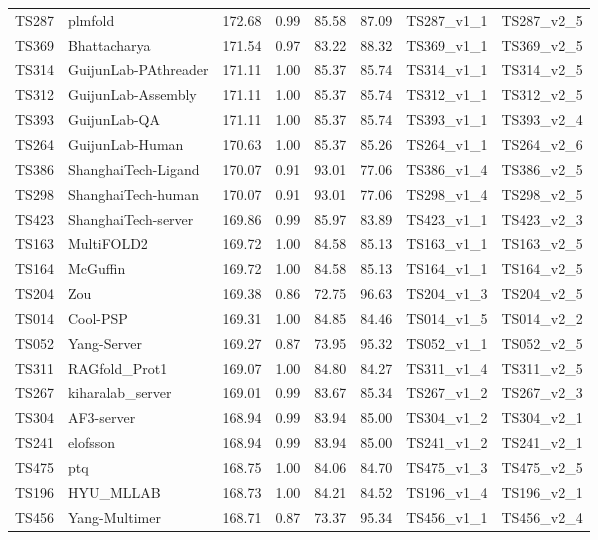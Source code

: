 \begin{table}[ht]
{\begin{tabular}{llllllll}
TS287 & plmfold & 172.68 & 0.99 & 85.58 & 87.09 & TS287\_v1\_1 & TS287\_v2\_5 \\ 
TS369 & Bhattacharya & 171.54 & 0.97 & 83.22 & 88.32 & TS369\_v1\_1 & TS369\_v2\_5 \\ 
TS314 & GuijunLab-PAthreader & 171.11 & 1.00 & 85.37 & 85.74 & TS314\_v1\_1 & TS314\_v2\_5 \\ 
TS312 & GuijunLab-Assembly & 171.11 & 1.00 & 85.37 & 85.74 & TS312\_v1\_1 & TS312\_v2\_5 \\ 
TS393 & GuijunLab-QA & 171.11 & 1.00 & 85.37 & 85.74 & TS393\_v1\_1 & TS393\_v2\_4 \\ 
TS264 & GuijunLab-Human & 170.63 & 1.00 & 85.37 & 85.26 & TS264\_v1\_1 & TS264\_v2\_6 \\ 
TS386 & ShanghaiTech-Ligand & 170.07 & 0.91 & 93.01 & 77.06 & TS386\_v1\_4 & TS386\_v2\_5 \\ 
TS298 & ShanghaiTech-human & 170.07 & 0.91 & 93.01 & 77.06 & TS298\_v1\_4 & TS298\_v2\_5 \\ 
TS423 & ShanghaiTech-server & 169.86 & 0.99 & 85.97 & 83.89 & TS423\_v1\_1 & TS423\_v2\_3 \\ 
TS163 & MultiFOLD2 & 169.72 & 1.00 & 84.58 & 85.13 & TS163\_v1\_1 & TS163\_v2\_5 \\ 
TS164 & McGuffin & 169.72 & 1.00 & 84.58 & 85.13 & TS164\_v1\_1 & TS164\_v2\_5 \\ 
TS204 & Zou & 169.38 & 0.86 & 72.75 & 96.63 & TS204\_v1\_3 & TS204\_v2\_5 \\ 
TS014 & Cool-PSP & 169.31 & 1.00 & 84.85 & 84.46 & TS014\_v1\_5 & TS014\_v2\_2 \\ 
TS052 & Yang-Server & 169.27 & 0.87 & 73.95 & 95.32 & TS052\_v1\_1 & TS052\_v2\_5 \\ 
TS311 & RAGfold\_Prot1 & 169.07 & 1.00 & 84.80 & 84.27 & TS311\_v1\_4 & TS311\_v2\_5 \\ 
TS267 & kiharalab\_server & 169.01 & 0.99 & 83.67 & 85.34 & TS267\_v1\_2 & TS267\_v2\_3 \\ 
TS304 & AF3-server & 168.94 & 0.99 & 83.94 & 85.00 & TS304\_v1\_2 & TS304\_v2\_1 \\ 
TS241 & elofsson & 168.94 & 0.99 & 83.94 & 85.00 & TS241\_v1\_2 & TS241\_v2\_1 \\ 
TS475 & ptq & 168.75 & 1.00 & 84.06 & 84.70 & TS475\_v1\_3 & TS475\_v2\_5 \\ 
TS196 & HYU\_MLLAB & 168.73 & 1.00 & 84.21 & 84.52 & TS196\_v1\_4 & TS196\_v2\_1 \\ 
TS456 & Yang-Multimer & 168.71 & 0.87 & 73.37 & 95.34 & TS456\_v1\_1 & TS456\_v2\_4 \\ 

\end{tabular}}
\end{table}
